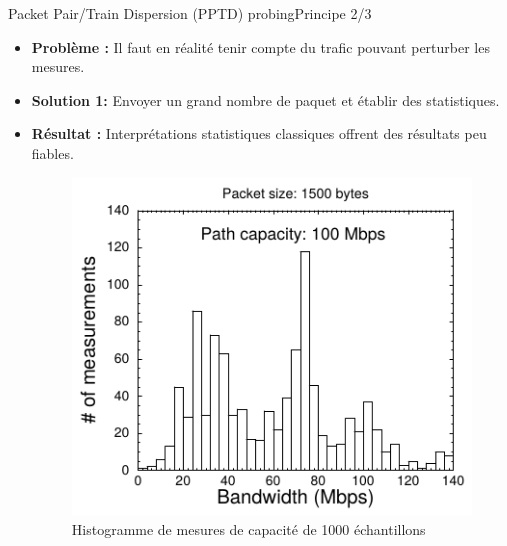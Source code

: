 \documentclass[compress]{beamer}
\begin{document}
\begin{frame}{Packet Pair/Train Dispersion (PPTD) probing}{Principe 2/3}
\begin{itemize}
	\item \textbf{Problème :} Il faut en réalité tenir compte du {\color{red}trafic} pouvant {\color{red}perturber} les mesures.
	\item \textbf{Solution 1:} Envoyer un {\color{red}grand nombre} de paquet et établir des statistiques.
	\item \textbf{Résultat :} Interprétations statistiques classiques offrent des résultats peu fiables. 
	\begin{figure}[hbtp]
		\centering
		\includegraphics[scale=0.4]{schema6.png}
		\caption{Histogramme de mesures de capacité de 1000 échantillons}
	\end{figure}
\end{itemize}
\end{frame}

\end{document}
